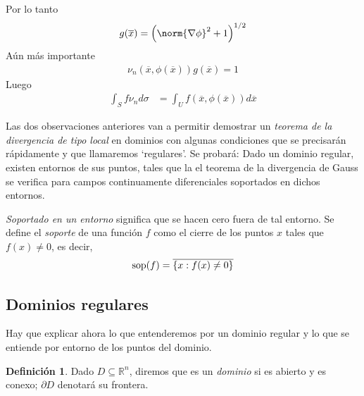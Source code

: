 \documentclass{report}
\newcommand{\realNumbers}{\mathbb{R}}
\theoremstyle{definition}
\newtheorem{definition}{Definición}
\theoremstyle{remark}
\DeclareMathOperator{\support}{\textnormal{sop}}
\begin{document}
  Por lo tanto
  \begin{align}
    g(\overline{x})
    =
    \left( \norm{\nabla \phi}^2 + 1 \right)^{1 / 2}
  \end{align}
  Aún más importante
  \begin{align}
    \nu_n(\overline{x}, \phi(\overline{x}))
    g(\overline{x})
    =
    1
  \end{align}
  Luego
  \begin{align}
    \int_S f \nu_n d \sigma
    &=
    \int_U
      f(\overline{x}, \phi(\overline{x}))
    d \overline{x}
  \end{align}

  \newpage
  Las dos observaciones anteriores van a permitir demostrar un \emph{teorema de la divergencia de tipo local} en dominios con algunas condiciones que se precisarán rápidamente y que llamaremos `regulares'.
  Se probará:
  Dado un dominio regular, existen entornos de sus puntos, tales que la el teorema de la divergencia de Gauss se verifica para campos continuamente diferenciales soportados en dichos entornos.

  \emph{Soportado en un entorno} significa que se hacen cero fuera de tal entorno.
  Se define el \emph{soporte} de una función \(f\) como el cierre de los puntos \(x\) tales que \(f(x) \neq 0\), es decir,
  \begin{align}
    \support(f)
    =
    \overline{\{x : f(x) \neq 0\}}
  \end{align}

  \subsection{Dominios regulares}

  Hay que explicar ahora lo que entenderemos por un dominio regular y lo que se entiende por entorno de los puntos del dominio.

  \begin{definition}
    Dado \(D \subseteq \realNumbers^n\), diremos que es un \emph{dominio} si es abierto y es conexo;
    \(\partial D\) denotará su frontera.
  \end{definition}
\end{document}
